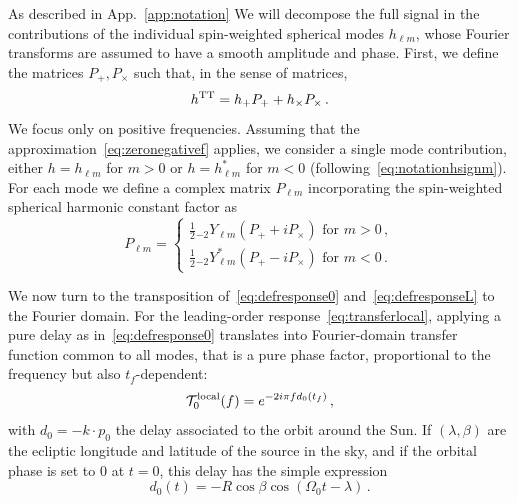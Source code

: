 \documentclass[aps,showpacs,twocolumn,
prd,superscriptaddress,nofootinbib]{revtex4-1}
\newcommand{\be}{\begin{equation}}
\newcommand{\ee}{\end{equation}}
\newcommand\calT{{\mathcal{T}}}
\newcommand{\hatk}{k}
\begin{document}
As described in App.~\ref{app:notation} We will decompose the full signal in the contributions of the individual spin-weighted spherical modes $h_{\ell m}$, whose Fourier transforms are assumed to have a smooth amplitude and phase. First, we define the matrices $P_{+},P_{\times}$ such that, in the sense of matrices,
\be
	h^{\rm TT} = h_{+}P_{+} + h_{\times}P_{\times} \,.
\ee
We focus only on positive frequencies. Assuming that the approximation~\eqref{eq:zeronegativef} applies, we consider a single mode contribution, either $h=h_{\ell m}$ for $m>0$ or $h=h_{\ell m}^{*}$ for $m<0$ (following~\eqref{eq:notationhsignm}). For each mode we define a complex matrix $P_{\ell m}$ incorporating the spin-weighted spherical harmonic constant factor as
\be
	P_{\ell m} = 
	\begin{cases} 
	\frac{1}{2} {}_{-2}Y_{\ell m} \left( P_{+} + i P_{\times} \right) \text{ for } m>0\,,\\
	\frac{1}{2} {}_{-2}Y_{\ell m}^{*} \left( P_{+} - i P_{\times} \right) \text{ for } m<0\,.
	\end{cases}
\ee

We now turn to the transposition of~\eqref{eq:defresponse0} and~\eqref{eq:defresponseL} to the Fourier domain. For the leading-order response~\eqref{eq:transferlocal}, applying a pure delay as in~\eqref{eq:defresponse0} translates into Fourier-domain transfer function common to all modes, that is a pure phase factor, proportional to the frequency but also $t_{f}$-dependent:
\be\label{eq:transfer0local}
	\calT_{0}^{\rm local}(f) = e^{-2i\pi f d_{0}(t_{f})}\,,
\ee
with $d_{0} = -\hatk \cdot p_{0}$ the delay associated to the orbit around the Sun. If $(\lambda, \beta)$ are the ecliptic longitude and latitude of the source in the sky, and if the orbital phase is set to $0$ at $t=0$, this delay has the simple expression
\be\label{eq:delay0}
	d_{0}(t) = -R \cos\beta \cos\left(\Omega_{0}t - \lambda\right)\,.
\ee
\end{document}
